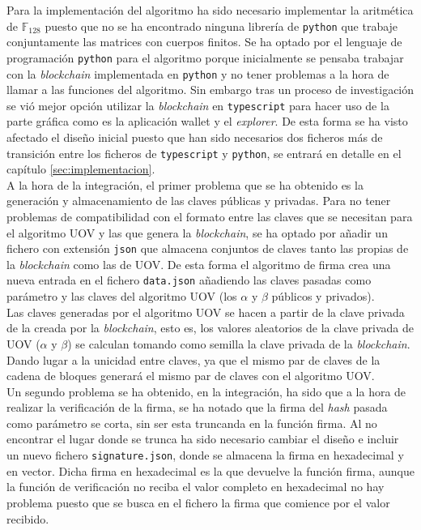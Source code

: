Para la implementación del algoritmo ha sido necesario implementar la aritmética de $\mathds{F}_{128}$ puesto que no se ha encontrado ninguna librería de \texttt{python} que trabaje conjuntamente las matrices con cuerpos finitos. Se ha optado por el lenguaje de programación \texttt{python} para el algoritmo porque inicialmente se pensaba trabajar con la \textit{blockchain} implementada en \texttt{python} y no tener problemas a la hora de llamar a las funciones del algoritmo. Sin embargo tras un proceso de investigación se vió mejor opción utilizar la \textit{blockchain} en \texttt{typescript} para hacer uso de la parte gráfica como es la aplicación wallet y el \textit{explorer}. De esta forma se ha visto afectado el diseño inicial puesto que han sido necesarios dos ficheros más de transición entre los ficheros de \texttt{typescript} y \texttt{python}, se entrará en detalle en el capítulo \ref{sec:implementacion}.\\

A la hora de la integración, el primer problema que se ha obtenido es la generación y almacenamiento de las claves públicas y privadas. Para no tener problemas de compatibilidad con el formato entre las claves que se necesitan para el algoritmo UOV y las que genera la \textit{blockchain}, se ha optado por añadir un fichero con extensión \texttt{json} que almacena conjuntos de claves tanto las propias de la \textit{blockchain} como las de UOV. De esta forma el algoritmo de firma crea una nueva entrada en el fichero \texttt{data.json} añadiendo las claves pasadas como parámetro y las claves del algoritmo UOV (los $\alpha$ y $\beta$ públicos y privados).\\

Las claves generadas por el algoritmo UOV se hacen a partir de la clave privada de la creada por la \textit{blockchain}, esto es, los valores aleatorios de la clave privada de UOV ($\alpha$ y $\beta$) se calculan tomando como semilla la clave privada de la \textit{blockchain}. Dando lugar a la unicidad entre claves, ya que el mismo par de claves de la cadena de bloques generará el mismo par de claves con el algoritmo UOV.\\

Un segundo problema se ha obtenido, en la integración, ha sido que a la hora de realizar la verificación de la firma, se ha notado que la firma del \textit{hash} pasada como parámetro se corta, sin ser esta truncanda en la función firma. Al no encontrar el lugar donde se trunca ha sido necesario cambiar el diseño e incluir un nuevo fichero \texttt{signature.json}, donde se almacena la firma en hexadecimal y en vector. Dicha firma en hexadecimal es la que devuelve la función firma, aunque la función de verificación no reciba el valor completo en hexadecimal no hay problema puesto que se busca en el fichero la firma que comience por el valor recibido. %

